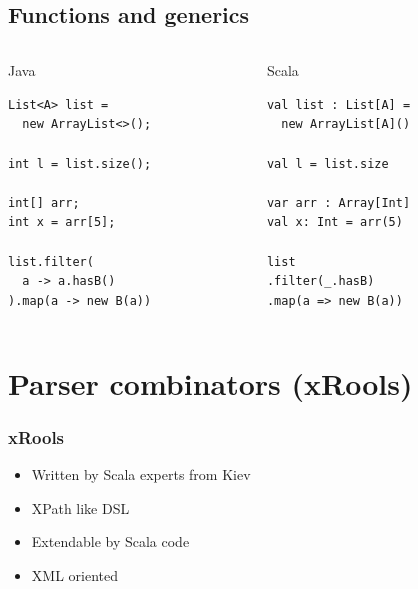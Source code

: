 \documentclass[14pt]{beamer}
\def\colored#1{\textcolor{myOrange}{#1}}
\begin{document}
\subsection{Functions and generics}
\begin{frame}[t,fragile]
  \begin{columns}
    \begin{column}[t]{0.45\textwidth}
\centering \Large \colored{Java} \\
    \begin{center}
\begin{lstlisting}[frame=single]
List<A> list = 
  new ArrayList<>();

int l = list.size();

int[] arr;
int x = arr[5];

list.filter(
  a -> a.hasB()
).map(a -> new B(a))
\end{lstlisting} 
    \end{center}
    \end{column}
    \begin{column}[t]{0.45\textwidth}
\centering \Large \colored{Scala} \\
    \pause
    \begin{center}
\begin{lstlisting}[frame=single]
val list : List[A] = 
  new ArrayList[A]()

val l = list.size

var arr : Array[Int]
val x: Int = arr(5)

list
.filter(_.hasB)
.map(a => new B(a))
\end{lstlisting}
    \end{center}

    \end{column}
  \end{columns}
\end{frame}

\section{Parser combinators (xRools)}
\frame
{\frametitle{xRools}
\begin{itemize}
  \item Written by Scala experts from Kiev
  \item XPath like DSL
  \item Extendable by Scala code
  \item XML oriented
\end{itemize}
}
\end{document}
